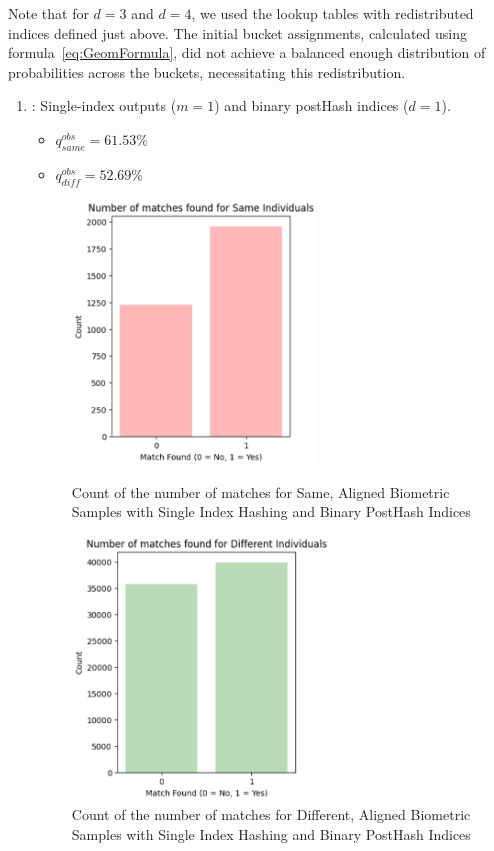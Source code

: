 Note that for \(d = 3\) and \(d = 4\), we used the lookup tables with redistributed indices defined just above. The initial bucket assignments, calculated using formula~\ref{eq:GeomFormula}, did not achieve a balanced enough distribution of probabilities across the buckets, necessitating this redistribution.

\begin{enumerate}
    \item {}: Single-index outputs (\(m=1\)) and binary postHash indices (\(d=1\)).
    \begin{itemize}
        \item \(q_{same}^{obs} = 61.53\%\)
        \item \(q_{diff}^{obs} = 52.69\%\)
    \end{itemize}

    \begin{figure}[H]
        \centering
        \begin{minipage}[b]{0.48\linewidth}
            \centering
            \includegraphics[width=\linewidth,height=7cm,keepaspectratio]{latex-img/d1same.png}
            \caption{Count of the number of matches for Same, Aligned Biometric Samples with Single Index Hashing and Binary PostHash Indices}
            \label{mu_same}
        \end{minipage}
        \hfill
        \begin{minipage}[b]{0.48\linewidth}
            \centering
            \includegraphics[width=\linewidth,height=7cm,keepaspectratio]{latex-img/d1diff.png}
            \caption{Count of the number of matches for Different, Aligned Biometric Samples with Single Index Hashing and Binary PostHash Indices}
            \label{mu_diff}
        \end{minipage}
    \end{figure}
    

\end{enumerate}
